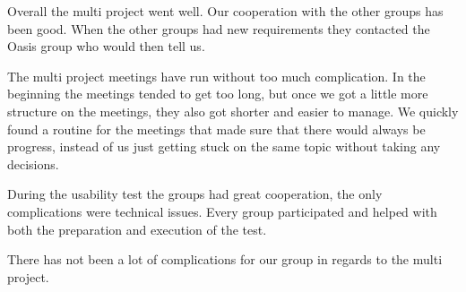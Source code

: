 Overall the multi project went well. Our cooperation with the other groups has been good.  When the other groups had new requirements they contacted the Oasis group who would then tell us. 

The multi project meetings have run without too much complication. In the beginning the meetings tended to get too long, but once we got a little more structure on the meetings, they also got shorter and easier to manage. We quickly found a routine for the meetings that made sure that there would always be progress, instead of us just getting stuck on the same topic without taking any decisions. 

During the usability test the groups had great cooperation, the only complications were technical issues. Every group participated and helped with both the preparation and execution of the test. 

There has not been a lot of complications for our group in regards to the multi project.